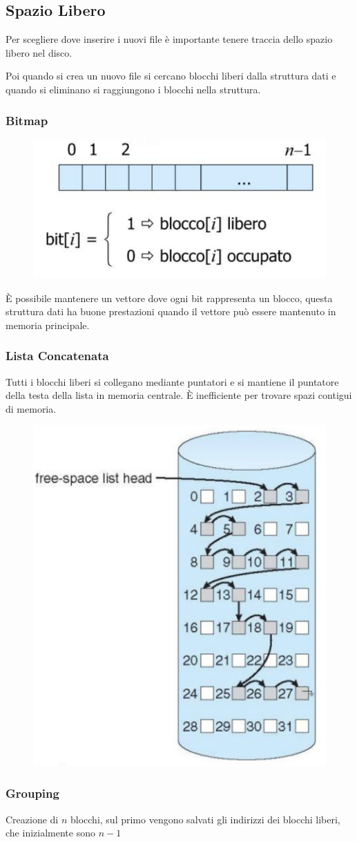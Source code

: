 \subsection{Spazio Libero}
Per scegliere dove inserire i nuovi file è importante tenere traccia dello spazio libero nel disco.

Poi quando si crea un nuovo file si cercano blocchi liberi dalla struttura dati e quando si eliminano si raggiungono i blocchi nella struttura.

\subsubsection{Bitmap}
\begin{figure}[H]
    \centering
    \includegraphics[width=0.4\linewidth]{assets/bitmap-libero.png}
\end{figure}

È possibile mantenere un vettore dove ogni bit rappresenta un blocco, questa struttura dati ha buone prestazioni quando il vettore può essere mantenuto in memoria principale.

\subsubsection{Lista Concatenata}
Tutti i blocchi liberi si collegano mediante puntatori e si mantiene il puntatore della testa della lista in memoria centrale. È inefficiente per trovare spazi contigui di memoria.

\begin{figure}[H]
    \centering
    \includegraphics[width=0.3\linewidth]{assets/spazio-libero-lista-concatenata.png}
\end{figure}


\subsubsection{Grouping}
Creazione di $n$ blocchi, sul primo vengono salvati gli indirizzi dei blocchi liberi, che inizialmente sono $n-1$


